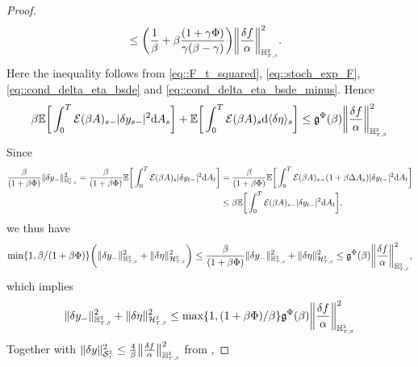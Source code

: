 \documentclass[10pt]{article} %
\newcommand\cE{\mathcal E}
\newcommand\cH{\mathcal H}
\newcommand\cS{\mathcal S}
\newcommand{\smalltext}[1]{\text{\fontsize{4}{4}\selectfont$#1$}}
\newcommand\fg{\mathfrak g}
\def \E{\mathbb{E}}
\def \H{\mathbb{H}}
\def\d{\mathrm{d}}
\begin{document}
\begin{proof}
\begin{align*}
		&\leq \bigg(\frac{1}{\beta} + \beta\frac{(1+\gamma\Phi)}{\gamma(\beta-\gamma)}\bigg) \bigg\|\frac{\delta f}{\alpha}\bigg\|^2_{\H^\smalltext{2}_{\smalltext{T}\smalltext{,}\smalltext{\beta}}}.
	\end{align*}
	Here the inequality follows from \eqref{eq::F_t_squared}, \eqref{eq::stoch_exp_F}, \eqref{eq::cond_delta_eta_bsde} and \eqref{eq::cond_delta_eta_bsde_minus}. Hence
	\begin{equation*}
		\beta \E\bigg[\int_0^T \cE(\beta A)_{s-}|\delta y_{s-}|^2\d A_s\bigg] + \E\bigg[\int_0^T \cE(\beta A)_s \d \langle\delta\eta\rangle_s\bigg] \leq \fg^\Phi(\beta) \bigg\|\frac{\delta f}{\alpha}\bigg\|^2_{\H^\smalltext{2}_{\smalltext{T}\smalltext{,}\smalltext{\beta}}}
	\end{equation*}
	 Since
	\begin{align*}
		\frac{\beta}{(1+\beta\Phi)}\|\delta y_{-}\|^2_{\H^\smalltext{2}_{\smalltext{T}\smalltext{,}\smalltext{\beta}}} = \frac{\beta}{(1+\beta\Phi)} \E\bigg[\int_0^T \cE(\beta A)_{s}|\delta y_{t-}|^2\d A_t\bigg] 
		&= \frac{\beta}{(1+\beta\Phi)} \E\bigg[\int_0^T \cE(\beta A)_{s-}(1+\beta\Delta A_s)|\delta y_{t-}|^2\d A_t\bigg] \\
		&\leq \beta \E\bigg[\int_0^T \cE(\beta A)_{s-}|\delta y_{t-}|^2\d A_t\bigg],
	\end{align*}
	we thus have
	\begin{equation*}
		\min\{1,\beta/(1+\beta\Phi)\} \bigg(\|\delta y_{-}\|^2_{\H^\smalltext{2}_{\smalltext{T}\smalltext{,}\smalltext{\beta}}} + \|\delta\eta\|^2_{\cH^\smalltext{2}_{\smalltext{T}\smalltext{,}\smalltext{\beta}}}\bigg) 
		\leq \frac{\beta}{(1+\beta\Phi)}\|\delta y_{-}\|^2_{\H^\smalltext{2}_{\smalltext{T}\smalltext{,}\smalltext{\beta}}} + \|\delta\eta\|^2_{\cH^\smalltext{2}_{\smalltext{T}\smalltext{,}\smalltext{\beta}}} 
		\leq \fg^\Phi(\beta) \bigg\|\frac{\delta f}{\alpha}\bigg\|^2_{\H^\smalltext{2}_{\smalltext{T}\smalltext{,}\smalltext{\beta}}},
	\end{equation*}
	which implies
	\begin{equation*}
		\|\delta y_{-}\|^2_{\H^\smalltext{2}_{\smalltext{T}\smalltext{,}\smalltext{\beta}}} + \|\delta\eta\|^2_{\cH^\smalltext{2}_{\smalltext{T}\smalltext{,}\smalltext{\beta}}}  
		\leq \max\{1,(1+\beta\Phi)/\beta\}\fg^\Phi(\beta) \bigg\|\frac{\delta f}{\alpha}\bigg\|^2_{\H^\smalltext{2}_{\smalltext{T}\smalltext{,}\smalltext{\beta}}}
	\end{equation*}
	Together with $\|\delta y\|^2_{\cS^\smalltext{2}_\smalltext{T}} \leq \frac{4}{\beta} \big\|\frac{\delta f}{\alpha}\big\|^2_{\H^\smalltext{2}_{\smalltext{T}\smalltext{,}\smalltext{\beta}}}$ from , 

\end{proof}
\end{document}
